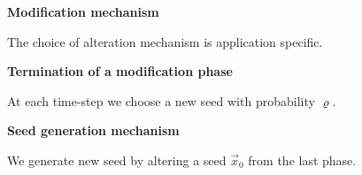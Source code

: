 \documentclass[landscape,footrule]{foils}
\begin{document}
\textbf{Modification mechanism}
\begin{triangles}
\item The choice of alteration mechanism is application specific.\vspace*{2ex} 
\end{triangles}

\textbf{Termination of a modification phase}
\begin{triangles}
\item At each time-step we choose a new seed with probability $\varrho$.\vspace*{2ex} 
\end{triangles}

\textbf{Seed generation mechanism}
\begin{triangles}
\item We generate new seed by altering a seed $\vec{x}_0$ from the last phase.\vspace*{1ex} 
\end{triangles}

\end{document}
